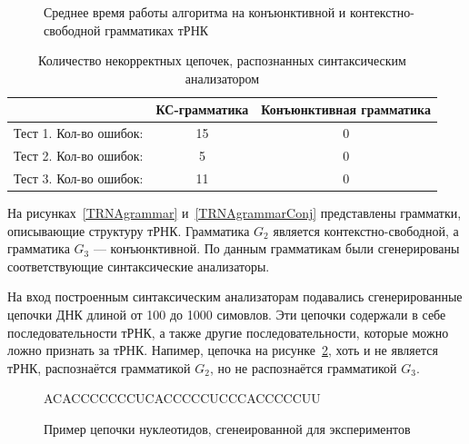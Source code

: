 \documentclass[14pt]{matmex-diploma-custom}
\begin{document}
\begin{figure}
\begin{center}
\end{center}
\caption{Среднее время работы алгоритма на конъюнктивной и контекстно-свободной грамматиках тРНК}
\label{time}
\end{figure}

\begin{table}[h]
\begin{center}
  \begin{tabular}{ | c | c | c |}
    \hline
     & КС-грамматика & Конъюнктивная грамматика \\ \hline
    Тест 1. Кол-во ошибок: & 15 & 0 \\\hline
    Тест 2. Кол-во ошибок: & 5 & 0 \\\hline
    Тест 3. Кол-во ошибок: & 11 & 0 \\
    \hline
  \end{tabular}
\end{center}
\caption{Количество некорректных цепочек, распознанных синтаксическим анализатором}
\label{mistakes}
\end{table}

На рисунках~\ref{TRNAgrammar} и~\ref{TRNAgrammarConj} представлены грамматки, описывающие структуру тРНК. Грамматика $G_2$ является контекстно-свободной, а грамматика $G_3$ --- конъюнктивной. По данным грамматикам были сгенерированы соответствующие синтаксические анализаторы.

На вход построенным синтаксическим анализаторам подавались сгенерированные цепочки ДНК длиной от 100 до 1000 симовлов. Эти цепочки содержали в себе последовательности тРНК, а также другие последовательности, которые можно ложно признать за тРНК. Напимер, цепочка на рисунке~\ref{rnachain}, хоть и не является тРНК, распознаётся грамматикой $G_2$, но не распознаётся грамматикой $G_3$.

\begin{figure}
\begin{center}
ACACCCCCCCUCACCCCCUCCCACCCCCUU
\end{center}
\caption{Пример цепочки нуклеотидов, сгенеированной для экспериментов}
\label{rnachain}
\end{figure}
\end{document}
